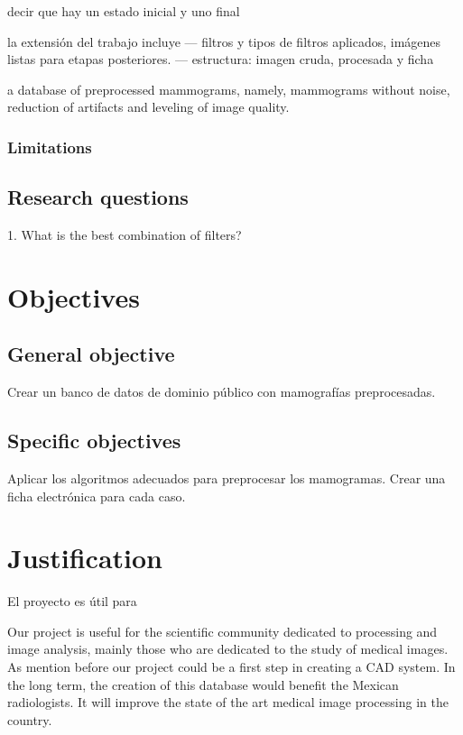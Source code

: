 decir que hay un estado inicial y uno final

la extensión del trabajo incluye --- filtros y tipos de filtros aplicados, imágenes listas para etapas posteriores. 
 --- estructura: imagen cruda, procesada y ficha

a database of preprocessed mammograms, namely, mammograms without noise,
reduction of artifacts and leveling of image quality.

\subsubsection{Limitations}

\subsection{Research questions}

1. What is the best combination of filters?

\section{Objectives}
\subsection{General objective}

Crear un banco de datos de dominio público con mamografías preprocesadas.

\subsection{Specific objectives}

Aplicar los algoritmos adecuados para preprocesar los mamogramas.
Crear una ficha electrónica para cada caso.

\section{Justification}

El proyecto es útil para

Our project is useful for the scientific community dedicated to processing and
image analysis, mainly those who are dedicated to the study of medical images.
As mention before our project could be a first step in creating a CAD system.
In the long term, the creation of this database would benefit the Mexican
radiologists. It will improve the state of the art medical image processing in
the country.

